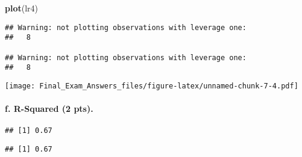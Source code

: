 \documentclass[]{article}
\newenvironment{Shaded}{\begin{snugshade}}{\end{snugshade}}
\newcommand{\KeywordTok}[1]{\textcolor[rgb]{0.13,0.29,0.53}{\textbf{#1}}}
\newcommand{\DecValTok}[1]{\textcolor[rgb]{0.00,0.00,0.81}{#1}}
\newcommand{\OperatorTok}[1]{\textcolor[rgb]{0.81,0.36,0.00}{\textbf{#1}}}
\newcommand{\NormalTok}[1]{#1}
\let\oldparagraph\paragraph
\renewcommand{\paragraph}[1]{\oldparagraph{#1}\mbox{}}
\begin{document}
\begin{Shaded}
\begin{Highlighting}[]
\KeywordTok{plot}\NormalTok{(lr4)}
\end{Highlighting}
\end{Shaded}

\begin{verbatim}
## Warning: not plotting observations with leverage one:
##   8

## Warning: not plotting observations with leverage one:
##   8
\end{verbatim}

\texttt{[image: Final\_Exam\_Answers\_files/figure-latex/unnamed-chunk-7-4.pdf]}

\paragraph{f. R-Squared (2 pts).}\label{f.-r-squared-2-pts.}

\begin{Shaded}
\end{Shaded}

\begin{verbatim}
## [1] 0.67
\end{verbatim}

\begin{Shaded}
\end{Shaded}

\begin{verbatim}
## [1] 0.67
\end{verbatim}

\begin{Shaded}
\end{Shaded}
\end{document}
